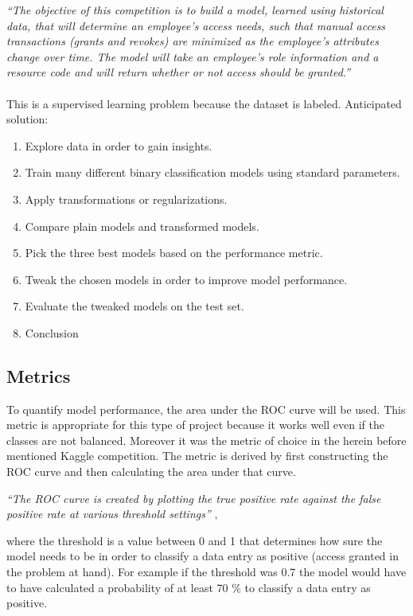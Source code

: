 \documentclass[11pt]{article}
\begin{document}
{\it ``The objective of this competition is to build a model, learned using 
historical data, that
 will determine an employee's access needs, such that manual access transactions 
 (grants and revokes) are minimized as the employee's attributes change over time. 
 The model will take an employee's role information and a resource code and will return whether 
 or not access should be granted.''}
\\ \\
This is a supervised learning problem because the dataset is labeled. 
Anticipated solution:

\begin{enumerate}
    \item Explore data in order to gain insights.
    \item Train many different binary classification models using standard parameters.
    \item Apply transformations or regularizations.
    \item Compare plain models and transformed models.
    \item Pick the three best models based on the performance metric.
    \item Tweak the chosen models in order to improve model performance.
    \item Evaluate the tweaked models on the test set.
    \item Conclusion
\end{enumerate}

\subsection{Metrics}

To quantify model performance, the area under the ROC curve will be used.
This metric is appropriate for this type of project because it works well
even if the classes are not balanced. Moreover it was the metric of choice
in the herein before mentioned Kaggle competition.
The metric is derived by first constructing the ROC curve and then 
calculating the area under that curve. 

{\it``The ROC curve is created by plotting the true positive rate against the false 
positive rate at various threshold settings''} \cite{rocCurve},
 
where the threshold is a value between 0 and 1 that determines how sure the model needs 
to be in order to classify a data entry as positive (access granted in the problem at hand). 
For example if the threshold was 0.7 the model would have to have calculated a probability 
of at least 70 $\%$ to classify a data entry as positive.
\end{document}
